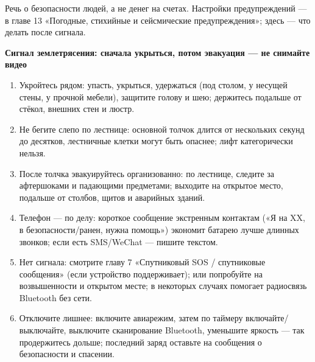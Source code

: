 


Речь о безопасности людей, а не денег на счетах. Настройки предупреждений — в главе 13 «Погодные, стихийные и сейсмические предупреждения»; здесь — что делать после сигнала.

\textbf{Сигнал землетрясения: сначала укрыться, потом эвакуация — не снимайте видео}\par

\begin{enumerate}
  \item Укройтесь рядом: упасть, укрыться, удержаться (под столом, у несущей стены, у прочной мебели), защитите голову и шею; держитесь подальше от стёкол, внешних стен и люстр.
  \item Не бегите слепо по лестнице: основной толчок длится от нескольких секунд до десятков, лестничные клетки могут быть опаснее; лифт категорически нельзя.
  \item После толчка эвакуируйтесь организованно: по лестнице, следите за афтершоками и падающими предметами; выходите на открытое место, подальше от столбов, щитов и аварийных зданий.
  \item Телефон — по делу: короткое сообщение экстренным контактам («Я на XX, в безопасности/ранен, нужна помощь») экономит батарею лучше длинных звонков; если есть SMS/WeChat — пишите текстом.
  \item Нет сигнала: смотрите главу 7 «Спутниковый SOS / спутниковые сообщения» (если устройство поддерживает); или попробуйте на возвышенности и открытом месте; в некоторых случаях помогает радиосвязь Bluetooth без сети.
  \item Отключите лишнее: включите авиарежим, затем по таймеру включайте/выключайте, выключите сканирование Bluetooth, уменьшите яркость — так продержитесь дольше; последний заряд оставьте на сообщения о безопасности и спасении.
\end{enumerate}

